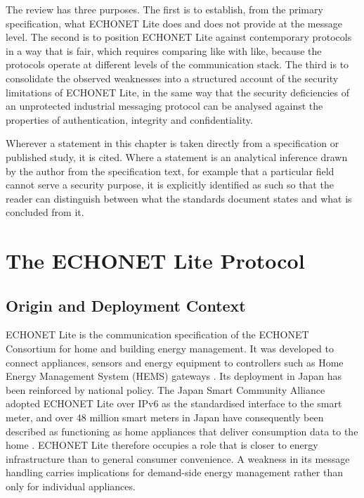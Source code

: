 The review has three purposes. The first is to establish, from the primary specification, what ECHONET Lite does and does not provide at the message level. The second is to position ECHONET Lite against contemporary protocols in a way that is fair, which requires comparing like with like, because the protocols operate at different levels of the communication stack. The third is to consolidate the observed weaknesses into a structured account of the security limitations of ECHONET Lite, in the same way that the security deficiencies of an unprotected industrial messaging protocol can be analysed against the properties of authentication, integrity and confidentiality.

Wherever a statement in this chapter is taken directly from a specification or published study, it is cited. Where a statement is an analytical inference drawn by the author from the specification text, for example that a particular field cannot serve a security purpose, it is explicitly identified as such so that the reader can distinguish between what the standards document states and what is concluded from it.

\section{The ECHONET Lite Protocol}
\label{sec:echonet-background}

\subsection{Origin and Deployment Context}

ECHONET Lite is the communication specification of the ECHONET Consortium for home and building energy management. It was developed to connect appliances, sensors and energy equipment to controllers such as Home Energy Management System (HEMS) gateways \cite{murakamiApplicationECHONETLite2016,isshikiCaseStudyEcological2015}. Its deployment in Japan has been reinforced by national policy. The Japan Smart Community Alliance adopted ECHONET Lite over IPv6 as the standardised interface to the smart meter, and over 48 million smart meters in Japan have consequently been described as functioning as home appliances that deliver consumption data to the home \cite{isshikiCaseStudyEcological2015}. ECHONET Lite therefore occupies a role that is closer to energy infrastructure than to general consumer convenience. A weakness in its message handling carries implications for demand-side energy management rather than only for individual appliances.


